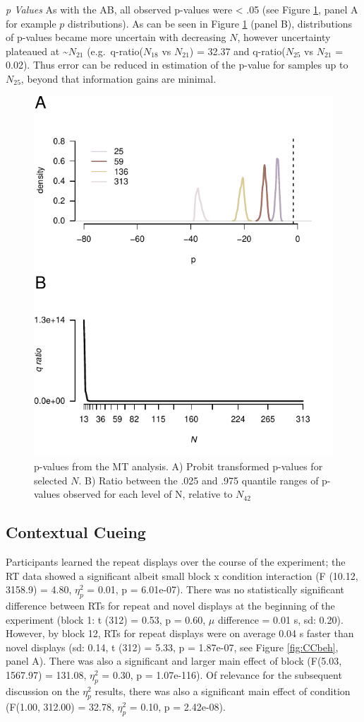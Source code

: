 \documentclass{article}
\begin{document}
\emph{p Values} As with the AB, all observed p-values were \textless{} .05 (see Figure \ref{fig:MTps}, panel A for example \(p\) distributions). As can be seen in Figure \ref{fig:MTps} (panel B), distributions of p-values became more uncertain with decreasing \(N\), however uncertainty plateaued at \textasciitilde{}\(N_{21}\) (e.g.~q-ratio(\(N_{18}\) vs \(N_{21}\)) = 32.37 and q-ratio(\(N_{25}\) vs \(N_{21}\) = 0.02). Thus error can be reduced in estimation of the p-value for samples up to \(N_{25}\), beyond that information gains are minimal.

\begin{figure}

{\centering \includegraphics[width=0.4\linewidth]{../images/IMMSD_ps} 

}

\caption{p-values from the MT analysis. A) Probit transformed p-values for selected $N$. B) Ratio between the .025 and .975 quantile ranges of p-values observed for each level of N, relative to $N_{42}$}\label{fig:MTps}
\end{figure}

\hypertarget{contextual-cueing}{%
\subsection{Contextual Cueing}\label{contextual-cueing}}

\label{sec:CCRes}

Participants learned the repeat displays over the course of the experiment; the RT data showed a significant albeit small block x condition interaction (F (10.12, 3158.9) = 4.80, \(\eta_{p}^2\) = 0.01, p = 6.01e-07). There was no statistically significant difference between RTs for repeat and novel displays at the beginning of the experiment (block 1: t (312) = 0.53, p = 0.60, \(\mu\) difference = 0.01 s, sd: 0.20). However, by block 12, RTs for repeat displays were on average 0.04 s faster than novel displays (sd: 0.14, t (312) = 5.33, p = 1.87e-07, see Figure \ref{fig:CCbeh}, panel A). There was also a significant and larger main effect of block (F(5.03, 1567.97) = 131.08, \(\eta_{p}^2\) = 0.30, p = 1.07e-116). Of relevance for the subsequent discussion on the \(\eta_{p}^2\) results, there was also a significant main effect of condition (F(1.00, 312.00) = 32.78, \(\eta_{p}^2\) = 0.10, p = 2.42e-08).
\end{document}

